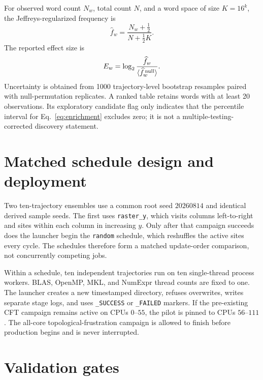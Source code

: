 \documentclass[aps,prb,onecolumn,nofootinbib,superscriptaddress]{revtex4-2}
\begin{document}
For observed word count \(N_w\), total count \(N\), and a word space of size
\(K=16^k\), the Jeffreys-regularized frequency is
\begin{equation}
 \widehat f_w=\frac{N_w+\tfrac12}{N+\tfrac12K}.
\end{equation}
The reported effect size is
\begin{equation}
 E_w=\log_2\frac{\widehat f_w}
 {\langle\widehat f_w^{\,\rm null}\rangle}.
 \label{eq:enrichment}
\end{equation}
Uncertainty is obtained from 1000 trajectory-level bootstrap resamples paired
with null-permutation replicates.  A ranked table retains words with at least
20 observations.  Its exploratory candidate flag only indicates that the
percentile interval for Eq.~\eqref{eq:enrichment} excludes zero; it is not a
multiple-testing-corrected discovery statement.

\section{Matched schedule design and deployment}

Two ten-trajectory ensembles use a common root seed \(20260814\) and identical
derived sample seeds.  The first uses \texttt{raster\_y}, which visits columns
left-to-right and sites within each column in increasing \(y\).  Only after
that campaign succeeds does the launcher begin the \texttt{random} schedule,
which reshuffles the active sites every cycle.  The schedules therefore form a
matched update-order comparison, not concurrently competing jobs.

Within a schedule, ten independent trajectories run on ten single-thread
process workers.  BLAS, OpenMP, MKL, and NumExpr thread counts are fixed to
one.  The launcher creates a new timestamped directory, refuses overwrites,
writes separate stage logs, and uses \texttt{\_SUCCESS} or
\texttt{\_FAILED} markers.  If the pre-existing CFT campaign remains active on
CPUs \(0\)--\(55\), the pilot is pinned to CPUs \(56\)--\(111\).  The
all-core topological-frustration campaign is allowed to finish before
production begins and is never interrupted.

\section{Validation gates}
\end{document}
